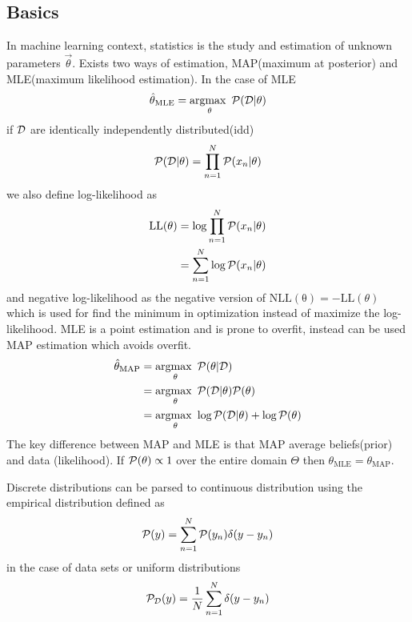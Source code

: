 \documentclass[../main.tex]{subfiles}
\begin{document}
\subsection{Basics}
In machine learning context, statistics is the study and estimation of unknown parameters $\vec{\theta}$. Exists two ways of estimation, MAP(maximum at posterior) and MLE(maximum likelihood estimation). In the case of MLE
\begin{equation*}
    \hat{\theta}_{\mathrm{MLE}} = \operatorname*{argmax\text{ }}_{\theta} \mathcal{P}(\mathcal{D}|\theta)
\end{equation*}
if $\mathcal{D}$ are identically independently distributed(idd)
\begin{equation*}
    \mathcal{P}(\mathcal{D}|\theta) = \prod_{n=1}^N \mathcal{P}(x_n|\theta)
\end{equation*}
we also define log-likelihood as
\begin{align*}
    \mathrm{LL}(\theta) &= \log \prod_{n=1}^N \mathcal{P}(x_n|\theta)\\
    &= \sum_{n=1}^N \log \mathcal{P}(x_n|\theta)
\end{align*}
and negative log-likelihood as the negative version of $\mathrm{NLL(\theta)}=-\mathrm{LL}(\theta)$ which is used for find the minimum in optimization instead of maximize the log-likelihood. MLE is a point estimation and is prone to overfit, instead can be used MAP estimation which avoids overfit.
\begin{align*}
    \hat{\theta}_{\mathrm{MAP}} &= \operatorname*{argmax\text{ }}_\theta \mathcal{P}(\theta|\mathcal{D})\\
    &= \operatorname*{argmax\text{ }}_\theta \mathcal{P}(\mathcal{D}|\theta)\mathcal{P}(\theta)\\
    &= \operatorname*{argmax\text{ }}_\theta \log\mathcal{P}(\mathcal{D}|\theta) + \log\mathcal{P}(\theta)
\end{align*}
The key difference between MAP and MLE is that MAP average beliefs(prior) and data (likelihood). If $\mathcal{P}(\theta)\propto 1$ over the entire domain $\Theta$  then $\theta_{\mathrm{MLE}}=\theta_\mathrm{MAP}$.

Discrete distributions can be parsed to continuous distribution using the empirical distribution defined as 
\begin{equation*}
    \mathcal{P}(y) = \sum_{n=1}^N \mathcal{P}(y_n) \delta(y-y_n)
\end{equation*}
in the case of data sets or uniform distributions
\begin{equation*}
    \mathcal{P}_{\mathcal{D}}(y) = \frac{1}{N}\sum_{n=1}^N \delta(y-y_n)
\end{equation*}
\end{document}
